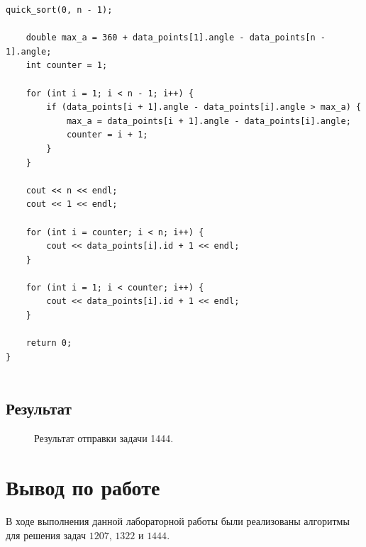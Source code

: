 \documentclass[a5paper, 10pt]{article}
\theoremstyle{definition}
\theoremstyle{plain}
\theoremstyle{remark}
\begin{document}
\begin{center}
\begin{lstlisting}[label=some-code,caption={Исходный код для 1444}]
    quick_sort(0, n - 1);

    double max_a = 360 + data_points[1].angle - data_points[n - 1].angle;
    int counter = 1;

    for (int i = 1; i < n - 1; i++) {
        if (data_points[i + 1].angle - data_points[i].angle > max_a) {
            max_a = data_points[i + 1].angle - data_points[i].angle;
            counter = i + 1;
        }
    }

    cout << n << endl;
    cout << 1 << endl;

    for (int i = counter; i < n; i++) {
        cout << data_points[i].id + 1 << endl;
    }

    for (int i = 1; i < counter; i++) {
        cout << data_points[i].id + 1 << endl;
    }

    return 0;
}


\end{lstlisting}
\end{center}

\subsection{Результат}
\begin{figure}[h]
\caption{Результат отправки задачи 1444.}
\end{figure}


\newpage



\newpage
\section{Вывод по работе}
В ходе выполнения данной лабораторной работы были реализованы алгоритмы для решения задач $1207$, $1322$ и $1444$. 
\end{document}
